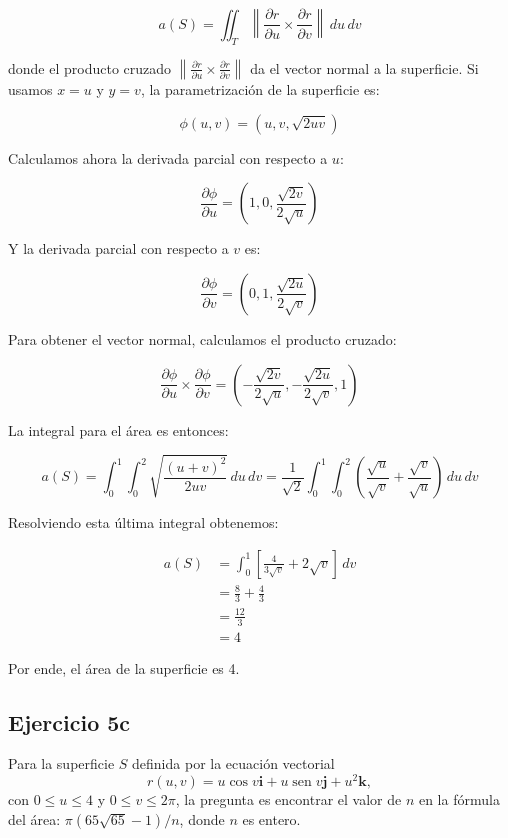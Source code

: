 \documentclass{report}
\begin{document}
\[
a(S) = \iint_T \left\|\frac{\partial r}{\partial u} \times \frac{\partial r}{\partial v}\right\| \, du \, dv
\]

donde el producto cruzado $\left\|\frac{\partial r}{\partial u} \times \frac{\partial r}{\partial v}\right\|$ da el vector normal a la superficie. Si usamos $x = u$ y $y = v$, la parametrización de la superficie es:

\[
\phi(u, v) = (u, v, \sqrt{2uv})
\]

Calculamos ahora la derivada parcial con respecto a $u$:

\[
\frac{\partial \phi}{\partial u} = \left( 1, 0, \frac{\sqrt{2v}}{2\sqrt{u}} \right)
\]

Y la derivada parcial con respecto a $v$ es:

\[
\frac{\partial \phi}{\partial v} = \left( 0, 1, \frac{\sqrt{2u}}{2\sqrt{v}} \right)
\]

Para obtener el vector normal, calculamos el producto cruzado:

\[
\frac{\partial \phi}{\partial u} \times \frac{\partial \phi}{\partial v} = \left( -\frac{\sqrt{2v}}{2\sqrt{u}}, -\frac{\sqrt{2u}}{2\sqrt{v}}, 1 \right)
\]

La integral para el área es entonces:

\[
a(S) = \int_0^1 \int_0^2 \sqrt{\frac{(u+v)^2}{2uv}} \, du \, dv = \frac{1}{\sqrt{2}} \int_0^1 \int_0^2 \left( \frac{\sqrt{u}}{\sqrt{v}} + \frac{\sqrt{v}}{\sqrt{u}} \right) \, du \, dv
\]

Resolviendo esta última integral obtenemos:

\[
\begin{aligned}
a(S) &= \int_0^1 \left[ \frac{4}{3\sqrt{v}} + 2\sqrt{v} \right] \, dv \\
&= \frac{8}{3} + \frac{4}{3} \\
&= \frac{12}{3} \\
&= 4
\end{aligned}
\]

Por ende, el área de la superficie es 4.

\subsection*{Ejercicio 5c}
Para la superficie $S$ definida por la ecuación vectorial
$$
r(u, v)=u \cos v \mathbf{i}+u \operatorname{sen} v \mathbf{j}+u^2 \mathbf{k},
$$
con $0 \leq u \leq 4$ y $0 \leq v \leq 2 \pi$, la pregunta es encontrar el valor de $n$ en la fórmula del área: $\pi(65 \sqrt{65}-1) / n$, donde $n$ es entero.
\end{document}
